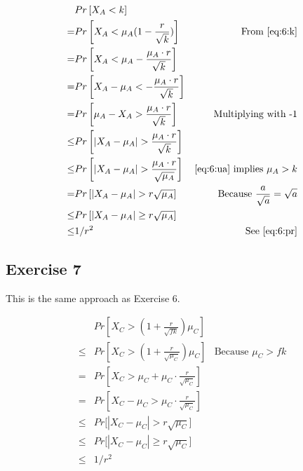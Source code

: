 \begin{align*}
	 & Pr\left[X_A < k\right] & \\
	=& Pr\left[X_A < \mu_A(1-\frac{r}{\sqrt{k}})\right] & \text{From \eqref{eq:6:k}} \\
	=& Pr\left[X_A < \mu_A - \frac{\mu_A \cdot r}{\sqrt{k}}\right] & \\
	=& Pr\left[X_A - \mu_A < -\frac{\mu_A \cdot r}{\sqrt{k}} \right] & \\
	=& Pr\left[\mu_A - X_A > \frac{\mu_A \cdot r}{\sqrt{k}} \right] & \text{Multiplying with -1} \\
	\leq & Pr\left[|X_A - \mu_A| > \frac{\mu_A \cdot r}{\sqrt{k}} \right] 
		& \\
	\leq & Pr\left[|X_A - \mu_A| > \frac{\mu_A \cdot r}{\sqrt{\mu_A}} \right]
		& \text{\eqref{eq:6:ua} implies $\mu_A > k$} \\
	=& Pr\left[|X_A - \mu_A| > r \sqrt{\mu_A} \right]
		& \text{Because $\frac{a}{\sqrt{a}} = \sqrt{a}$}\\
	\leq & Pr\left[|X_A - \mu_A| \geq r \sqrt{\mu_A} \right]
		& \\
	\leq & 1/r^2 & \text{See \eqref{eq:6:pr}}
\end{align*}

\subsection{Exercise 7}
This is the same approach as Exercise 6.

\begin{align*}
	& Pr\left[ X_C > (1+\frac{r}{\sqrt{fk}}) \mu_C \right] & \\
	\leq & Pr\left[ X_C > (1+\frac{r}{\sqrt{\mu_C}}) \mu_C \right]
		& \text{Because $\mu_C > fk$} \\
	=& Pr\left[ X_C > \mu_C + \mu_C \cdot \frac{r}{\sqrt{\mu_C}} \right]
		& \\
	=& Pr\left[ X_C - \mu_C > \mu_C \cdot \frac{r}{\sqrt{\mu_C}} \right]
		& \\
	\leq& Pr\Big[ | X_C - \mu_C | > r \sqrt{\mu_C} \Big]
		& \\
	\leq& Pr\Big[ | X_C - \mu_C | \geq r \sqrt{\mu_C} \Big]
		& \\
	\leq& 1/r^2
\end{align*}

